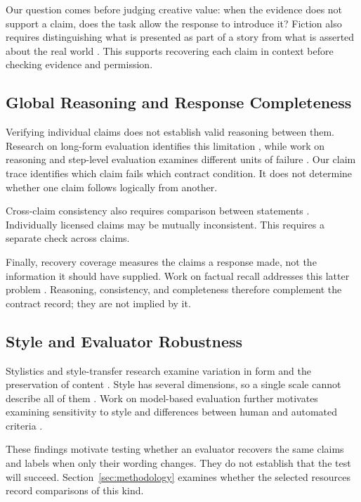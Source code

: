 \documentclass{clv2025}
\begin{document}
Our question comes before judging creative value: when the evidence does not
support a claim, does the task allow the response to introduce it? Fiction
also requires distinguishing what is presented as part of a story from what
is asserted about the real world \citep{searle_logical_1975}. This supports
recovering each claim in context before checking evidence and permission.

\subsection{Global Reasoning and Response Completeness}\label{subsec:global}

Verifying individual claims does not establish valid reasoning between them.
Research on long-form evaluation identifies this limitation
\citep{yan_logicscore_2026}, while work on reasoning and step-level evaluation
examines different units of failure
\citep{arcuschin_cot_2025,pham_grace_2026}.
Our claim trace identifies which claim fails which contract condition. It
does not determine whether one claim follows logically from another.

Cross-claim consistency also requires comparison between statements
\citep{mundler_selfcontradictory_2024}. Individually licensed claims may be
mutually inconsistent. This requires a separate check across claims.

Finally, recovery coverage measures the claims a response made, not the
information it should have supplied. Work on factual recall addresses this
latter problem \citep{liu_verifact_2025,jafari_recall_2026}.
Reasoning, consistency, and completeness therefore complement the contract
record; they are not implied by it.

\subsection{Style and Evaluator Robustness}

Stylistics and style-transfer research examine variation in form and the
preservation of content
\citep{leech_short_style_1981,vanpeer_stylistics_2020,rao_dear_2018,briakou_evaluating_2021}.
Style has several dimensions, so a single scale cannot describe all of them
\citep{kang_style_2021,jin_deep_2022}.
Work on model-based evaluation further motivates examining sensitivity to
style and differences between human and automated criteria
\citep{feuer_style_2025,lyu_converge_2026}.

These findings motivate testing whether an evaluator recovers the same
claims and labels when only their wording changes. They do not establish
that the test will succeed. Section~\ref{sec:methodology} examines whether the selected
resources record comparisons of this kind.
\end{document}
